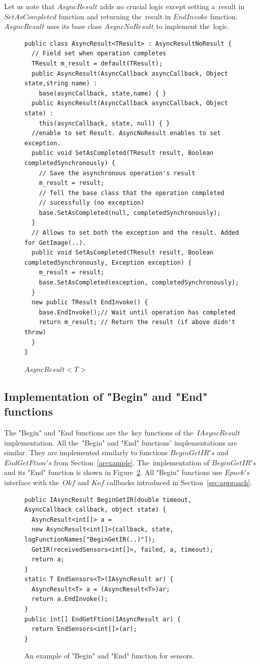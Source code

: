   Let us note that $AsyncResult$ adds no crucial logic except setting 
  a~result in $SetAsCompleted$ function and
  returning the~result in $EndInvoke$ function. 
  $AsyncResult$ uses its base class $AsyncNoResult$ to implement the~logic.
\begin{figure}[!hbp]
\begin{lstlisting}
public class AsyncResult<TResult> : AsyncResultNoResult {
  // Field set when operation completes
  TResult m_result = default(TResult);
  public AsyncResult(AsyncCallback asyncCallback, Object state,string name) : 
    base(asyncCallback, state,name) { }
  public AsyncResult(AsyncCallback asyncCallback, Object state) : 
    this(asyncCallback, state, null) { }
  //enable to set Result. AsyncNoResult enables to set exception.
  public void SetAsCompleted(TResult result, Boolean completedSynchronously) {
    // Save the asynchronous operation's result
    m_result = result;
    // Tell the base class that the operation completed 
    // sucessfully (no exception)
    base.SetAsCompleted(null, completedSynchronously);
  }
  // Allows to set both the exception and the result. Added for GetImage(..).
  public void SetAsCompleted(TResult result, Boolean completedSynchronously, Exception exception) {
    m_result = result;
    base.SetAsCompleted(exception, completedSynchronously);
  }
  new public TResult EndInvoke() {
    base.EndInvoke();// Wait until operation has completed 
    return m_result; // Return the result (if above didn't throw)
  }
}
\end{lstlisting}
\caption{$AsyncResult<T>$} \label{result}
\end{figure}
  \subsection*{Implementation of "Begin" and "End" functions} 
  The "Begin" and "End functions are the~key functions of the~$IAsyncResult$ implementation.
  All the~"Begin" and "End" functions' implementations are similar. 
  They are implemented similarly to functions $BeginGetIR's$
  and $EndGetFtion's$ from Section~\ref{arexample}.
  The~implementation of $BeginGetIR's$ and its "End" function is shown in Figure~\ref{beginsens}.
  All "Begin" functions use $Epuck's$ interface with the~$Okf$ and $Kof$ callbacks introduced
  in Section~\ref{sec:approach}.	

\begin{figure}[!hbp]
\begin{lstlisting}
public IAsyncResult BeginGetIR(double timeout, AsyncCallback callback, object state) {
  AsyncResult<int[]> a = 
  new AsyncResult<int[]>(callback, state, logFunctionNames["BeginGetIR(..)"]);
  GetIR(receivedSensors<int[]>, failed, a, timeout);
  return a;
}
static T EndSensors<T>(IAsyncResult ar) {
  AsyncResult<T> a = (AsyncResult<T>)ar;
  return a.EndInvoke();
}
public int[] EndGetFtion(IAsyncResult ar) { 
  return EndSensors<int[]>(ar); 
}
\end{lstlisting}	
\caption{An example of "Begin" and "End" function for sensors.}
\label{beginsens}
\end{figure}

